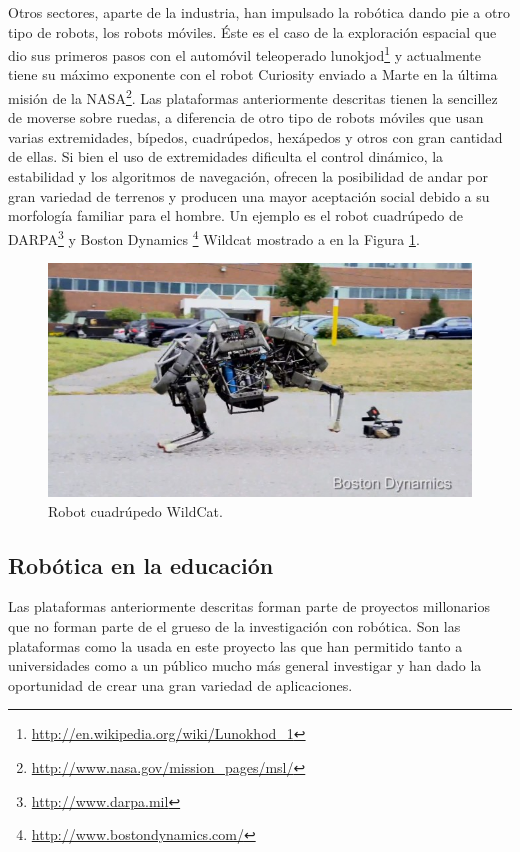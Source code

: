 \documentclass[12pt,a4paper,final,twoside]{book}
\begin{document}
Otros sectores, aparte de la industria, han impulsado la robótica dando pie a otro tipo de robots, los robots móviles. Éste es el caso de la exploración espacial que dio sus primeros pasos con el automóvil teleoperado lunokjod\footnote{\url{http://en.wikipedia.org/wiki/Lunokhod_1}} y actualmente tiene su máximo exponente con el robot Curiosity enviado a Marte en la última misión de la NASA\footnote{\url{http://www.nasa.gov/mission_pages/msl/}}. Las plataformas anteriormente descritas tienen la sencillez de moverse sobre ruedas, a diferencia de otro tipo de robots móviles que usan varias extremidades, bípedos, cuadrúpedos, hexápedos y otros con gran cantidad de ellas. Si bien el uso de extremidades dificulta el control dinámico, la estabilidad y los algoritmos de  navegación, ofrecen la posibilidad de andar por gran variedad de terrenos y producen una mayor aceptación social debido a su morfología familiar para el hombre. Un ejemplo es el robot cuadrúpedo de DARPA\footnote{\url{http://www.darpa.mil}} y Boston Dynamics \footnote{\url{http://www.bostondynamics.com/}} Wildcat mostrado a en la Figura \ref{fig:wildcat}.

\begin{figure}[H]
	\centering
    \includegraphics[scale=0.6]	{images/Wildcat.jpg}
	 \caption{Robot cuadrúpedo WildCat.}
  \label{fig:wildcat}
\end{figure}

\subsection{Robótica en la educación}

Las plataformas anteriormente descritas forman parte de proyectos millonarios que no forman parte de el grueso de la investigación con robótica.
Son las plataformas como la usada en este proyecto las que han permitido tanto a universidades como a un público mucho más general investigar y han dado la oportunidad de crear una gran variedad de aplicaciones.
\end{document}
